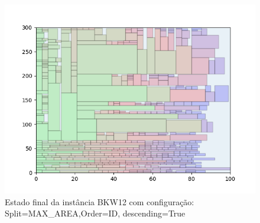 \begin{figure}[H]
    \centering
    \caption[]{Estado final da instância BKW12 com configuração: Split=MAX_AREA,Order=ID, descending=True}
    \label{fig:bkw12-max_area-id-true}
    \includegraphics[scale=0.5]{output/figures/bkw/bkw12/max_area/id/true/000}
\end{figure}